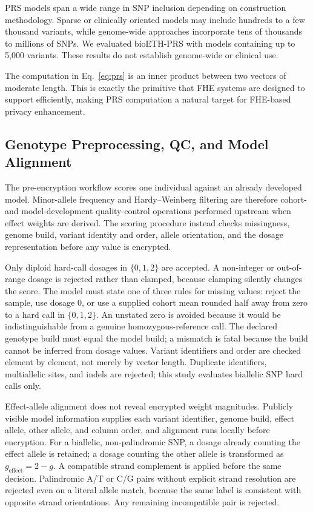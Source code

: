 \documentclass[10pt]{article}
\begin{document}
PRS models span a wide range in SNP inclusion depending on construction methodology.
Sparse or clinically oriented models may include hundreds to a few thousand variants,
while genome-wide approaches incorporate tens of thousands to millions of SNPs.  We
evaluated bioETH-PRS with models containing up to 5,000 variants.  These results do not
establish genome-wide or clinical use.

The computation in Eq.~\ref{eq:prs} is an inner product between two vectors of
moderate length.  This is exactly the primitive that FHE systems are designed to
support efficiently, making PRS computation a natural target for FHE-based privacy
enhancement.

\subsection{Genotype Preprocessing, QC, and Model Alignment}
\label{sec:preprocessing}

The pre-encryption workflow scores one individual against an already developed model.  Minor-allele
frequency and Hardy--Weinberg filtering are therefore cohort- and model-development
quality-control operations performed upstream when effect weights are derived.  The
scoring procedure instead checks missingness, genome build, variant identity and
order, allele orientation, and the dosage representation before any value is encrypted.

Only diploid hard-call dosages in $\{0,1,2\}$ are accepted.  A non-integer or
out-of-range dosage is rejected rather than clamped, because clamping silently changes
the score.  The model must state one of three rules for missing values: reject the
sample, use dosage 0, or use a supplied cohort mean rounded half away from zero to a
hard call in $\{0,1,2\}$.  An unstated zero is avoided because it would be
indistinguishable from a genuine homozygous-reference call.
The declared genotype build must equal the model build; a mismatch is fatal because the
build cannot be inferred from dosage values.  Variant identifiers and order are checked
element by element, not merely by vector length.  Duplicate identifiers, multiallelic
sites, and indels are rejected; this study evaluates biallelic SNP hard calls only.

Effect-allele alignment does not reveal encrypted weight magnitudes.  Publicly visible model
information supplies each variant identifier, genome build, effect allele, other allele,
and column order, and alignment runs locally before encryption.  For a biallelic,
non-palindromic SNP, a dosage already counting the effect allele is retained; a dosage
counting the other allele is transformed as $g_{\mathrm{effect}}=2-g$.  A compatible
strand complement is applied before the same decision.  Palindromic A/T or C/G pairs
without explicit strand resolution are rejected even on a literal allele match, because
the same label is consistent with opposite strand orientations.  Any remaining
incompatible pair is rejected.
\end{document}
